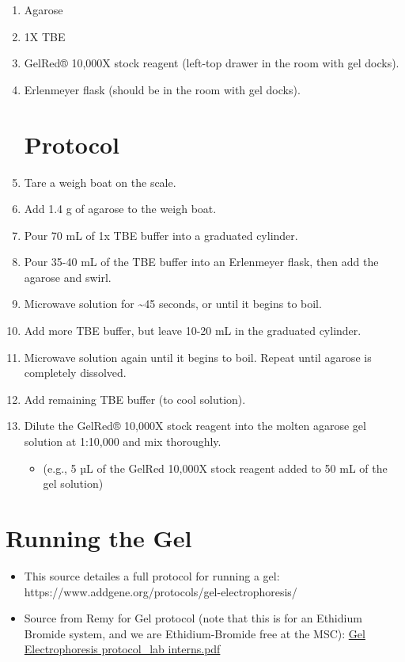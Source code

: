 \documentclass[
  letterpaper,
  DIV=11,
  numbers=noendperiod]{scrreprt}
\providecommand{\tightlist}{%
  \setlength{\itemsep}{0pt}\setlength{\parskip}{0pt}}\usepackage{longtable,booktabs,array}
\begin{document}
\begin{enumerate}
\def\labelenumi{\arabic{enumi}.}
\item
  Agarose
\item
  1X TBE
\item
  GelRed® 10,000X stock reagent (left-top drawer in the room with gel
  docks).
\item
  Erlenmeyer flask (should be in the room with gel docks).

  \hypertarget{protocol-3}{%
  \section*{Protocol}\label{protocol-3}}
\item
  Tare a weigh boat on the scale.
\item
  Add 1.4 g of agarose to the weigh boat.
\item
  Pour 70 mL of 1x TBE buffer into a graduated cylinder.
\item
  Pour 35-40 mL of the TBE buffer into an Erlenmeyer flask, then add the
  agarose and swirl.
\item
  Microwave solution for \textasciitilde45 seconds, or until it begins
  to boil.
\item
  Add more TBE buffer, but leave 10-20 mL in the graduated cylinder.
\item
  Microwave solution again until it begins to boil. Repeat until agarose
  is completely dissolved.
\item
  Add remaining TBE buffer (to cool solution).
\item
  Dilute the GelRed® 10,000X stock reagent into the molten agarose gel
  solution at 1:10,000 and mix thoroughly.

  \begin{itemize}
  \tightlist
  \item
    (e.g., 5 µL of the GelRed 10,000X stock reagent added to 50 mL of
    the gel solution)
  \end{itemize}
\end{enumerate}

\hypertarget{running-the-gel}{%
\section*{\texorpdfstring{\textbf{Running the
Gel}}{Running the Gel}}\label{running-the-gel}}

\begin{itemize}
\item
  This source detailes a full protocol for running a gel:
  https://www.addgene.org/protocols/gel-electrophoresis/
\item
  Source from Remy for Gel protocol (note that this is for an Ethidium
  Bromide system, and we are Ethidium-Bromide free at the MSC):
  \href{https://github.com/DrK-Lo/lotterhoslabprotocols/files/8584679/Gel.Electrophoresis.protocol_lab.interns.pdf}{Gel
  Electrophoresis protocol\_lab interns.pdf}\\
\end{itemize}
\end{document}
